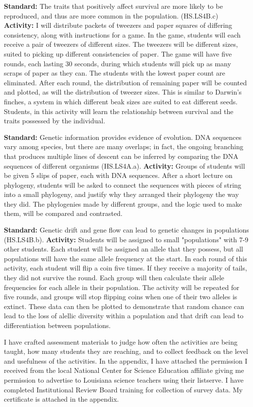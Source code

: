 \documentclass[12pt]{article}
\begin{document}
\textbf{Standard:} The traits that positively affect survival are more likely to be reproduced, and thus are more common in the
population. (HS.LS4B.c) \textbf{Activity:} I will distribute packets of tweezers and paper squares of differing consistency, along with instructions for a game. 
In the game, students will each receive a pair of tweezers of different sizes.
The tweezers will be different sizes, suited to picking up different consistencies of paper.
The game will have five rounds, each lasting 30 seconds, during which students will pick up as many scraps of paper as they can.
The students with the lowest paper count are eliminated.
After each round, the distribution of remaining paper will be counted and plotted, as will the distribution of tweezer sizes.
This is similar to Darwin's finches, a system in which different beak sizes are suited to eat different seeds. 
Students, in this activity will learn the relationship between survival and the traits possessed by the individual.  \par
\textbf{Standard:} Genetic information provides evidence of evolution.
DNA sequences vary among species, but there are
many overlaps; in fact, the ongoing branching that
produces multiple lines of descent can be inferred by
comparing the DNA sequences of different organisms (HS.LS4A.a). 
\textbf{Activity:} Groups of students will be given 5 slips of paper, each with DNA sequences.
After a short lecture on phylogeny, students will be asked to connect the sequences with pieces of string into a small phylogeny, and justify why they arranged their phylogeny the way they did.
The phylogenies made by different groups, and the logic used to make them, will be compared and contrasted. \par
\textbf{Standard:} Genetic drift and gene flow can lead to genetic changes in populations (HS.LS4B.b).
\textbf{Activity:} Students will be assigned to small "populations" with 7-9 other students.
Each student will be assigned an allele that they possess, but all populations will have the same allele frequency at the start.
In each round of this activity, each student will flip a coin five times.
If they receive a majority of tails, they did not survive the round.
Each group will then calculate their allele frequencies for each allele in their population. 
The activity will be repeated for five rounds, and groups will stop flipping coins when one of their two alleles is extinct.
These data can then be plotted to demonstrate that random chance can lead to the loss of alellic diversity within a population and that drift can lead to differentiation between populations.
\par
I have crafted assessment materials to judge how often the activities are being taught, how many students they are reaching, and to collect feedback on the level and usefulness of the activities. 
In the appendix, I have attached the permission I received from the local National Center for Science Education affiliate giving me permission to advertise to Louisiana science teachers using their listserve. 
I have completed Institutional Review Board training for collection of survey data.
My certificate is attached in the appendix. \par
\end{document}
